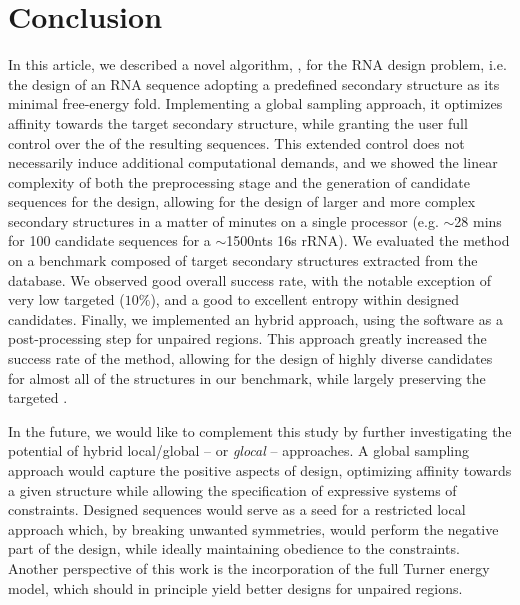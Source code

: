 \section{Conclusion}

\label{sec:conclusion}

In this article, we described a novel algorithm, \ourprog, for the RNA design problem, i.e. the design of an RNA sequence adopting a predefined secondary structure as its minimal free-energy fold.
Implementing a global sampling approach, it optimizes affinity towards the target secondary structure, while granting the user full control over the \GCContent of the resulting sequences.
This extended control does not necessarily induce additional computational demands, and we showed the linear complexity of both the preprocessing stage and the generation of candidate sequences for the design, allowing for the design of larger and more complex secondary structures in a matter of minutes on a single processor (e.g. $\sim$28 mins for 100 candidate sequences for a $\sim$1500nts 16s rRNA). We evaluated the method on a benchmark composed of target secondary structures extracted from the \RNASTRAND database. We observed good overall success rate, with the notable exception of very low targeted \GCContent ($10\%$), and a good to excellent entropy within designed candidates.
Finally, we implemented an hybrid approach, using the \RNAinverse software as a post-processing step for unpaired regions. This approach greatly increased the success rate of the method, allowing for the design of highly diverse candidates for almost all of the structures in our benchmark, while largely preserving the targeted \GCContent.

In the future, we would like to complement this study by further investigating the potential of hybrid local/global -- or {\em glocal} -- approaches.
A global sampling approach would capture the positive aspects of design, optimizing affinity towards a given structure while allowing the specification of expressive systems of constraints.
Designed sequences would serve as a seed for a restricted local approach which, by breaking unwanted symmetries, would perform the negative part of the design, 
while ideally maintaining obedience to the constraints. Another perspective of this work is the incorporation of the full Turner energy model, which should in principle yield better designs for unpaired regions.